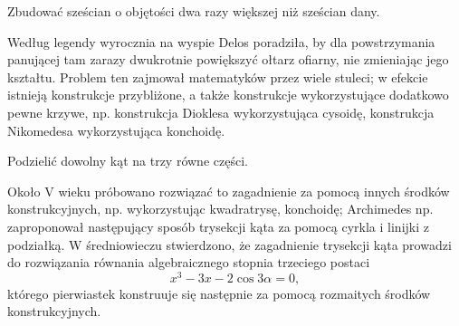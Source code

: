 \begin{problem}
    Zbudować sześcian o objętości dwa razy większej niż sześcian dany.
\end{problem}

Według legendy wyrocznia na wyspie Delos poradziła, by dla powstrzymania panującej tam zarazy dwukrotnie powiększyć ołtarz ofiarny, nie zmieniając jego kształtu.
Problem ten zajmował matematyków przez wiele stuleci; w efekcie istnieją konstrukcje przybliżone, a także konstrukcje wykorzystujące dodatkowo pewne krzywe, np. konstrukcja Dioklesa wykorzystująca cysoidę, konstrukcja Nikomedesa wykorzystująca konchoidę.

\begin{problem}
    Podzielić dowolny kąt na trzy równe części.
\end{problem}

Około V wieku próbowano rozwiązać to zagadnienie za pomocą innych środków konstrukcyjnych, np. wykorzystując kwadratrysę, konchoidę; Archimedes np. zaproponował następujący sposób trysekcji kąta za pomocą cyrkla i linijki z podziałką.
W średniowieczu stwierdzono, że zagadnienie trysekcji kąta prowadzi do rozwiązania równania algebraicznego stopnia trzeciego postaci
\begin{equation}
    x^3 - 3 x - 2 \cos 3\alpha = 0,
\end{equation}
którego pierwiastek konstruuje się następnie za pomocą rozmaitych środków konstrukcyjnych.

